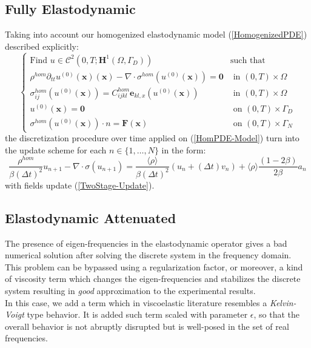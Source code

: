 \subsection{Fully Elastodynamic}

Taking into account our homogenized elastodynamic model (\ref{HomogenizedPDE}) described explicitly:
\begin{equation}
    \label{HomPDE-Model}
    \left \{
    \begin{array}{cc}
        \text{Find $u \in \mathcal{C}^2(0,T;\mathbf{H}^1(\Omega, \Gamma_D))$} & \text{such that} \\
        \rho^{hom} \partial_{tt} u^{(0)}(\mathbf{x}) (\mathbf{x}) - \nabla \cdot \sigma^{hom} (u^{(0)}(\mathbf{x}) ) = \mathbf{0} & \text{ in } (0,T)\times \Omega \\
        \sigma^{hom}_{ij}(u^{(0)}(\mathbf{x})) = C^{hom}_{ijkl}\mathbf{e}_{kl,x}(u^{(0)}(\mathbf{x})) & \text{ in } (0,T)\times \Omega \\
        u^{(0)}(\mathbf{x}) = \mathbf{0} & \text{ on } (0,T)\times \Gamma_D \\
        \sigma^{hom}(u^{(0)}(\mathbf{x})) \cdot n = \mathbf{F}(\mathbf{x}) & \text{ on } (0,T)\times \Gamma_N
    \end{array}
    \right .
\end{equation}
the discretization procedure over time applied on (\ref{HomPDE-Model}) turn into the update scheme for each $n \in \{1,\dots, N\}$ in the form:
\begin{equation*}
    \label{HomPDE-TimeUpdate}
    \frac{\rho^{hom}}{\beta (\Delta t)^2} u_{n+1} - \nabla \cdot \sigma(u_{n+1}) = \frac{\langle\rho\rangle}{\beta (\Delta t)^2} ( u_{n} + (\Delta t) v_n ) + \langle\rho\rangle\frac{(1-2\beta)}{2\beta} a_n
\end{equation*}
with fields update (\ref{TwoStage-Update}).

\subsection{Elastodynamic Attenuated}
The presence of eigen-frequencies in the elastodynamic operator gives a bad numerical solution after solving the discrete system in the frequency domain. This problem can be bypassed using a regularization factor, or moreover, a kind of viscosity term which changes the eigen-frequencies and stabilizes the discrete system resulting in \textit{good} approximation to the experimental results.\\
In this case, we add a term which in viscoelastic literature resembles a \textit{Kelvin-Voigt} type behavior. It is added such term scaled with parameter $\epsilon$, so that the overall behavior is not abruptly disrupted but is well-posed in the set of real frequencies.

